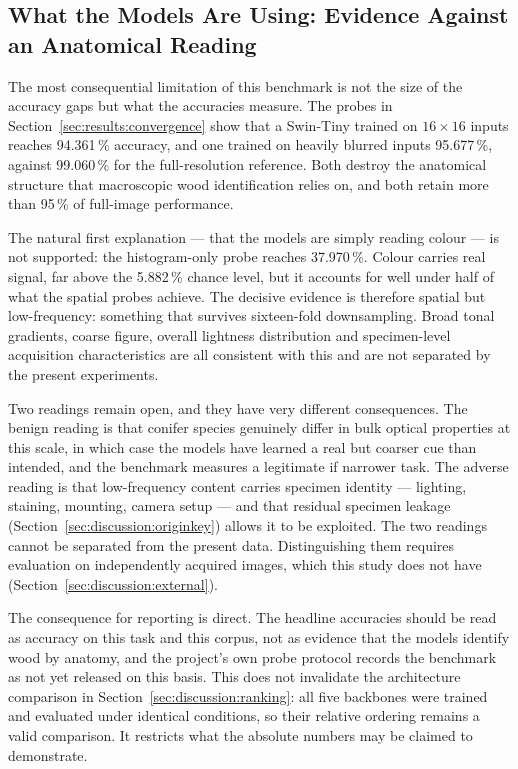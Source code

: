 \subsection{What the Models Are Using: Evidence Against an Anatomical Reading}
\label{sec:discussion:shortcut}

The most consequential limitation of this benchmark is not the size of the
accuracy gaps but what the accuracies measure. The probes in
Section~\ref{sec:results:convergence} show that a Swin-Tiny trained on
$16\times16$ inputs reaches 94.361\,\% accuracy, and one trained on heavily
blurred inputs 95.677\,\%, against 99.060\,\% for the full-resolution
reference. Both destroy the anatomical structure that macroscopic wood
identification relies on, and both retain more than 95\,\% of full-image
performance.

The natural first explanation --- that the models are simply reading
colour --- is not supported: the histogram-only probe reaches 37.970\,\%.
Colour carries real signal, far above the 5.882\,\% chance level, but it
accounts for well under half of what the spatial probes achieve. The
decisive evidence is therefore spatial but low-frequency: something that
survives sixteen-fold downsampling. Broad tonal gradients, coarse
figure, overall lightness distribution and specimen-level acquisition
characteristics are all consistent with this and are not separated by the
present experiments.

Two readings remain open, and they have very different consequences. The
benign reading is that conifer species genuinely differ in bulk optical
properties at this scale, in which case the models have learned a real but
coarser cue than intended, and the benchmark measures a legitimate if
narrower task. The adverse reading is that low-frequency content carries
specimen identity --- lighting, staining, mounting, camera setup --- and
that residual specimen leakage (Section~\ref{sec:discussion:originkey})
allows it to be exploited. The two readings cannot be separated from the
present data. Distinguishing them requires evaluation on independently
acquired images, which this study does not have
(Section~\ref{sec:discussion:external}).

The consequence for reporting is direct. The headline accuracies should be
read as accuracy on this task and this corpus, not as evidence that the
models identify wood by anatomy, and the project's own probe protocol
records the benchmark as not yet released on this basis. This does not
invalidate the architecture comparison in
Section~\ref{sec:discussion:ranking}: all five backbones were trained and
evaluated under identical conditions, so their relative ordering remains a
valid comparison. It restricts what the absolute numbers may be claimed to
demonstrate.


